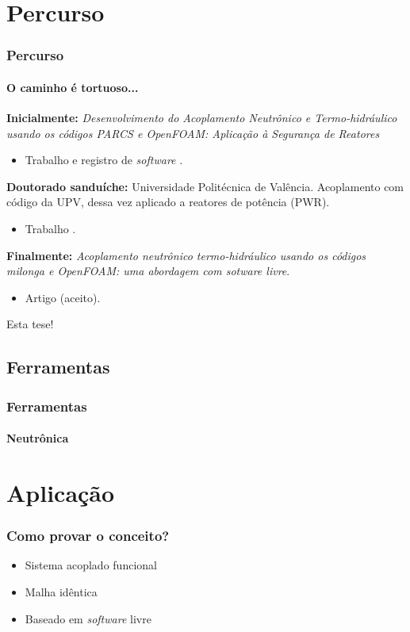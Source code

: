 \documentclass[svgnames,smaller,table]{beamer}
\begin{document}
\section{Percurso}
\begin{frame}
  \frametitle{Percurso}
  \framesubtitle{O caminho é tortuoso...}
  \textbf{Inicialmente:} \textit{Desenvolvimento do Acoplamento
Neutrônico e Termo-hidráulico usando os códigos PARCS
e OpenFOAM: Aplicação à Segurança de Reatores} \cite{PARCS2006}

  \begin{itemize}
    \item Trabalho \cite{Silva2013} e registro de \textit{software} \cite{TrigaFuel2013}.
  \end{itemize}
   \textbf{Doutorado sanduíche:} Universidade Politécnica de Valência.
    Acoplamento com código da UPV, dessa vez aplicado a reatores
    de potência (PWR).
  \begin{itemize}
    \item Trabalho \cite{Silva2015}.
  \end{itemize}
  \textbf{Finalmente:} \textit{Acoplamento neutrônico termo-hidráulico usando
    os códigos milonga e OpenFOAM: uma abordagem com sotware livre}.
  \begin{itemize}
    \item Artigo (aceito).
  \end{itemize}
  \centering
  \pause \alert{Esta tese!}

\end{frame}

\subsection{Ferramentas}
\begin{frame}
  \frametitle{Ferramentas}
  \framesubtitle{Neutrônica}
  
\end{frame}

\section{Aplicação}
\begin{frame}
  \frametitle{Como provar o conceito?}
  \begin{itemize}
  \item Sistema acoplado funcional
  \item Malha idêntica
  \item Baseado em \textit{software} livre
  \end{itemize}
\end{frame}
\end{document}
